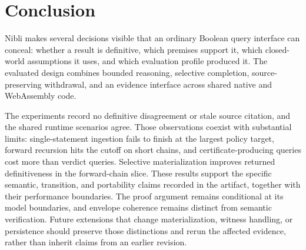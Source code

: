 \section{Conclusion}

Nibli makes several decisions visible that an ordinary Boolean query interface
can conceal: whether a result is definitive, which premises support it, which
closed-world assumptions it uses, and which evaluation profile produced it.
The evaluated design combines bounded reasoning, selective completion,
source-preserving withdrawal, and an evidence interface across shared native
and WebAssembly code.

The experiments record no definitive disagreement or stale source citation,
and the shared runtime scenarios agree. Those observations coexist with
substantial limits: single-statement ingestion fails to finish at the largest
policy target, forward recursion hits the cutoff on short chains, and
certificate-producing queries cost more than verdict queries. Selective
materialization improves returned definitiveness in the forward-chain slice.
These results support the specific semantic, transition, and portability
claims recorded in the artifact, together with their performance boundaries.
The proof argument remains conditional at its model boundaries, and envelope
coherence remains distinct from semantic verification. Future extensions that
change materialization, witness handling, or persistence should preserve those
distinctions and rerun the affected evidence, rather than inherit claims from
an earlier revision.
